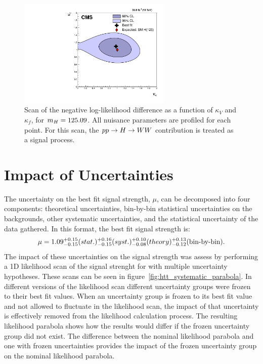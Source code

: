 \begin{figure}[!ht]
  \centering
    \includegraphics[width=0.65\textwidth]{higgs_to_taus/plots/Figure_022.pdf}
   \caption{Scan of the negative log-likelihood difference as a function of $\kappa_V$ and $\kappa_f$, for 
$m_{H} = 125.09$\GeV.  All nuisance parameters are profiled for each point. For this scan, the $pp\to H\to WW$ 
contribution is treated as a signal process.}
\label{fig:htt_kVkf}
\end{figure}


\section{Impact of Uncertainties}
The uncertainty on the best fit signal strength, $\mu$, can be decomposed into four components: theoretical uncertainties, 
bin-by-bin statistical uncertainties on the backgrounds, other systematic uncertainties, and the statistical 
uncertainty of the data gathered. In this format, the best fit signal strength is:
\[ \mu = 1.09^{+0.15}_{-0.15}(stat.){}^{+0.16}_{-0.15}(syst.){}^{+0.10}_{-0.08}(theory){}^{+0.13}_{-0.12} \text{(bin-by-bin).}\]
The impact of these uncertainties on the signal strength was assess by performing a 1D likelihood scan of 
the signal strenght for with multiple uncertainty hypotheses. These scans can be seen in 
figure~\ref{fig:htt_systematic_parabola}. In different versions of the likelihood scan
different uncertainty groups were frozen to their best fit values. When an uncertainty group is frozen to
its best fit value and not allowed to fluctuate in the likelihood scan, the impact of that uncertainty is
effectively removed from the likelihood calculation process. The resulting likelihood parabola shows how
the results would differ if the frozen uncertainty group did not exist. The difference between the nominal
likelihood parabola and one with frozen uncertainties provides the impact of the frozen uncertainty group
on the nominal likelihood parabola.



